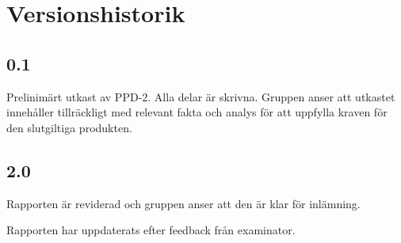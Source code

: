 \section*{Versionshistorik}

\subsection*{0.1}
Prelinimärt utkast av PPD-2. Alla delar är skrivna. Gruppen anser att utkastet innehåller tillräckligt med relevant fakta och analys för att uppfylla kraven för den slutgiltiga produkten.

\subsection*{2.0}
Rapporten är reviderad och gruppen anser att den är klar för inlämning.

Rapporten har uppdaterats efter feedback från examinator.
